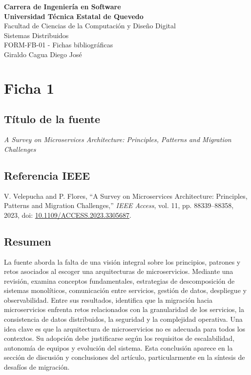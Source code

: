 \documentclass[11pt]{article}
\begin{document}
\begin{center}
    {\large \textbf{Carrera de Ingeniería en Software}}\\[0.3cm]

    {\large \textbf{Universidad Técnica Estatal de Quevedo}}\\[0.2cm]
    {\large Facultad de Ciencias de la Computación y Diseño Digital}\\[0.3cm]

    {\large {Sistemas Distribuidos}}\\[0.2cm]
    {\large FORM-FB-01 - Fichas bibliográficas}\\[0.5cm]

    {\large {Giraldo Cagua Diego José}}
\end{center}

\vspace{1cm}


\section*{Ficha 1}

\subsection*{Título de la fuente}
\textit{A Survey on Microservices Architecture: Principles, Patterns and Migration Challenges}

\subsection*{Referencia IEEE}
V. Velepucha and P. Flores, ``A Survey on Microservices Architecture: Principles, Patterns and Migration Challenges,'' \textit{IEEE Access}, vol. 11, pp. 88339--88358, 2023, doi: \href{https://doi.org/10.1109/ACCESS.2023.3305687}{10.1109/ACCESS.2023.3305687}.

\subsection*{Resumen}
La fuente aborda la falta de una visión integral sobre los principios, patrones y retos asociados al escoger una arquitecturas de microservicios. Mediante una revisión, examina conceptos fundamentales, estrategias de descomposición de sistemas monolíticos, comunicación entre servicios, gestión de datos, despliegue y observabilidad. Entre sus resultados, identifica que la migración hacia microservicios enfrenta retos relacionados con la granularidad de los servicios, la consistencia de datos distribuidos, la seguridad y la complejidad operativa. Una idea clave es que la arquitectura de microservicios no es adecuada para todos los contextos. Su adopción debe justificarse según los requisitos de escalabilidad, autonomía de equipos y evolución del sistema. Esta conclusión aparece en la sección de discusión y conclusiones del artículo, particularmente en la síntesis de desafíos de migración.
\end{document}
